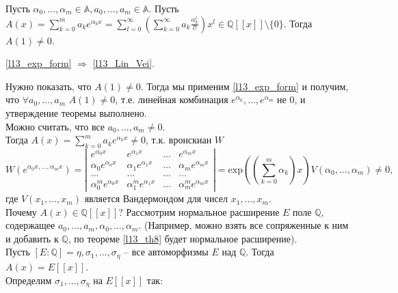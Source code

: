 \begin{theorem} \label{l13_exp_form}
	Пусть $\alpha_0, \ldots, \alpha_m \in \mathbb{A}, a_0, \ldots, a_m \in \mathbb{A}$. Пусть $\displaystyle A(x) = \sum_{k = 0}^{m} a_k e^{\alpha_k x} = \sum_{l = 0}^{\infty} \left( \sum_{k = 0}^{\infty} a_k \frac{\alpha_k^l}{l!} \right)x^l \in \mathbb{Q}[[x]] \setminus \lbrace 0 \rbrace$.
	Тогда $A(1) \ne 0$.
\end{theorem}

\begin{theorem} \label{l13_th10}
	\ref{l13_exp_form} $\Rightarrow$ \ref{l13_Lin_Vei}.
\end{theorem}
\begin{pf}
	Нужно показать, что $A(1) \ne 0$. Тогда мы применим \ref{l13_exp_form} и получим, что $\forall a_0, \ldots, a_m$ $A(1) \ne 0$, т.е. линейная комбинация $e^{\alpha_0}, \ldots, e^{\alpha_m}$ не 0, и утверждение теоремы выполнено.\\
	Можно считать, что все $a_0, \ldots, a_m \ne 0$.\\
	Тогда $\displaystyle A(x) = \sum_{k = 0}^{m} a_k e^{\alpha_k x} \ne 0$, т.к. вронскиан $W$\\
	\[ W(e^{\alpha_0 x, \ldots, \alpha_m x}) = \left|
	\begin{array}{cccc}
		e^{\alpha_0 x}       & e^{\alpha_1 x}   & \ldots & e^{\alpha_m x}  \\
	\alpha_0 e^{\alpha_0 x}       & \alpha_1 e^{\alpha_1 x}   & \ldots & \alpha_m e^{\alpha_m x} \\
	\ldots & \ldots & \ldots & \ldots \\
	\alpha_0^m e^{\alpha_0 x}       & \alpha_1^m e^{\alpha_1 x}   & \ldots & \alpha_m^m e^{\alpha_m x}
    \end{array} \right|  = \mathrm{exp}\left(\left(\sum_{k=0}^{m} \alpha_k\right)x\right)  V(\alpha_0, \ldots, \alpha_m) \ne 0,\]
    где $V(x_1, \ldots, x_m)$ является Вандермондом для чисел $x_1, \ldots, x_m$.\\
    Почему $A(x) \in \mathbb{Q}[[x]]$? Рассмотрим нормальное расширение $E$ поле $\mathbb{Q}$, содержащее $a_0, \ldots, a_m, \alpha_0, \ldots, \alpha_m$. (Например, можно взять все сопряженные к ним и добавить к $\mathbb{Q}$, по теореме \ref{l13_th8} будет нормальное расширение).\\
    Пусть $[E : \mathbb{Q}] = \eta, \sigma_1, \ldots, \sigma_{\eta}$ -- все автоморфизмы $E$ над $\mathbb{Q}$. Тогда $A(x) = E[[x]]$.\\
    Определим $\sigma_1, \ldots, \sigma_{\eta}$ на $E[[x]]$ так:

\end{pf}
